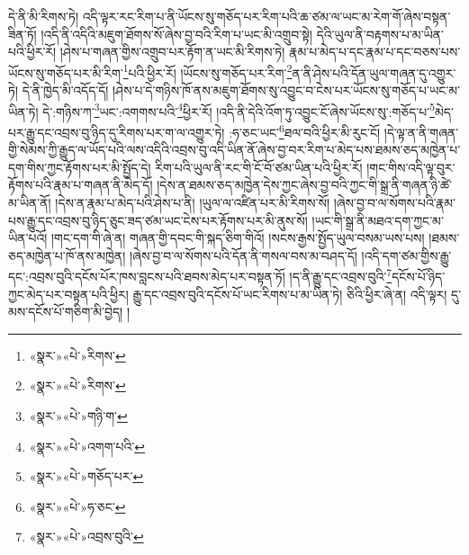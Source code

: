 དེ་ནི་མི་རིགས་ཏེ། འདི་ལྟར་རང་རིག་པ་ནི་ཡོངས་སུ་གཅོད་པར་རིག་པའི་ཆ་ཙམ་ལ་ཡང་མ་རེག་གོ་ཞེས་བསྟན་ཟིན་ཏོ། །འདི་ནི་འདིའི་མཇུག་ཐོགས་སོ་ཞེས་བྱ་བའི་རིག་པ་ཡང་མི་འགྲུབ་སྟེ། དེའི་ཡུལ་ནི་བརྟགས་པ་མ་ཡིན་པའི་ཕྱིར་རོ། །ཤེས་པ་གཞན་གྱིས་འགྲུབ་པར་རྟོག་ན་ཡང་མི་རིགས་ཏེ། རྣམ་པ་མེད་པ་དང་རྣམ་པ་དང་བཅས་པས་ཡོངས་སུ་གཅོད་པར་མི་རིག་\footnote{«སྣར་»«པེ་»རིགས་}པའི་ཕྱིར་རོ། །ཡོངས་སུ་གཅོད་པར་རིག་\footnote{«སྣར་»«པེ་»རིགས་}ན་ནི་ཤེས་པའི་དོན་ཡུལ་གཞན་དུ་འགྱུར་ཏེ། དེ་ནི་ཁྱེད་མི་འདོད་དོ། །ཤེས་པ་དེ་གཉིས་ཁོ་ནས་མཇུག་ཐོགས་སུ་འབྱུང་བ་ངེས་པར་ཡོངས་སུ་གཅོད་པ་ཡང་མ་ཡིན་ཏེ། དེ་:གཉིས་ཀ་\footnote{«སྣར་»«པེ་»གཉི་ག་}ཡང་:འགགས་པའི་\footnote{«སྣར་»«པེ་»འགག་པའི་}ཕྱིར་རོ། །འདི་ནི་དེའི་འོག་ཏུ་འབྱུང་ངོ་ཞེས་ཡོངས་སུ་:གཅོད་པ་\footnote{«སྣར་»«པེ་»གཅོད་པར་}མེད་པར་རྒྱུ་དང་འབྲས་བུ་ཉིད་དུ་རིགས་པར་ག་ལ་འགྱུར་ཏེ། :ཧ་ཅང་ཡང་\footnote{«སྣར་»«པེ་»ཧ་ཅང་}ཐལ་བའི་ཕྱིར་མི་རུང་ངོ། །དེ་ལྟ་ན་ནི་གཞན་གྱི་སེམས་ཀྱི་རྒྱུད་ལ་ཡོད་པའི་ལས་འདིའི་འབྲས་བུ་འདི་ཡིན་ནོ་ཞེས་བྱ་བར་རིག་པ་མེད་པས་ཐམས་ཅད་མཁྱེན་པ་དག་གིས་ཀྱང་རྟོགས་པར་མི་སྤྱོད་དེ། རིག་པའི་ཡུལ་ནི་རང་གི་ངོ་བོ་ཙམ་ཡིན་པའི་ཕྱིར་རོ། །གང་གིས་འདི་ལྟ་བུར་རྟོགས་པའི་རྣམ་པ་གཞན་ནི་མེད་དོ། །དེས་ན་ཐམས་ཅད་མཁྱེན་དེས་ཀྱང་ཞེས་བྱ་བའི་ཀྱང་གི་སྒྲ་ནི་གཞན་ཉི་ཚེ་མ་ཡིན་ནོ། །དེས་ན་རྣམ་པ་མེད་པའི་ཤེས་པ་ནི། །ཡུལ་ལ་འཛིན་པར་མི་རིགས་སོ། །ཞེས་བྱ་བ་ལ་སོགས་པའི་རྣམ་པས་རྒྱུ་དང་འབྲས་བུ་ཉིད་ཅུང་ཟད་ཙམ་ཡང་ངེས་པར་རྟོགས་པར་མི་ནུས་སོ། །ཡང་གི་སྒྲ་ནི་མཐའ་དག་ཀྱང་མ་ཡིན་པའོ། །གང་དག་གི་ཞེ་ན། གཞན་གྱི་དབང་གི་སྐད་ཅིག་གིའོ། །སངས་རྒྱས་སྤྱོད་ཡུལ་བསམ་ཡས་པས། །ཐམས་ཅད་མཁྱེན་པ་ཁོ་ནས་མཁྱེན། །ཞེས་བྱ་བ་ལ་སོགས་པའི་དོན་ནི་གསལ་བས་མ་བཤད་དོ། །འདི་དག་ཙམ་གྱིས་རྒྱུ་དང་:འབྲས་བུའི་དངོས་པོར་ཁས་བླངས་པའི་ཐབས་མེད་པར་བསྟན་ཏོ། །ད་ནི་རྒྱུ་དང་འབྲས་བུའི་\footnote{«སྣར་»«པེ་»འབྲས་བུའི་}དངོས་པོ་ཉིད་ཀྱང་མེད་པར་བསྟན་པའི་ཕྱིར། རྒྱུ་དང་འབྲས་བུའི་དངོས་པོ་ཡང་རིགས་པ་མ་ཡིན་ཏེ། ཅིའི་ཕྱིར་ཞེ་ན། འདི་ལྟར། དུ་མས་དངོས་པོ་གཅིག་མི་བྱེད། །
